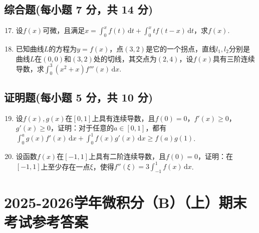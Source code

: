 \documentclass[../Main.tex]{subfiles}
\begin{document}
\section{综合题(每小题 7 分，共 14 分)}
\begin{enumerate}
    \setcounter{enumi}{16}
    \item 设$f(x)$可微，且满足$x=\int_{0}^{x}f(t)\,\mathrm{d}t+\int_{0}^{x}tf(
              t-x)\,\mathrm{d}t$，求$f(x)$.
          \vspace{12em}

    \item 已知曲线$L$的方程为$y=f(x)$，点$(3,2)$是它的一个拐点，直线$l_{1},l
                  _{2}$分别是曲线$L$在$(0,0)$和$(3,2)$处的切线，其交点为$(2,4)$，设$f(x)$具有三阶连续导数，求$\int
              _{0}^{3}(x^{2}+x)f'''(x)\,\mathrm{d}x$.
          \vspace{13em}
\end{enumerate}

\section{证明题(每小题 5 分，共 10 分)}
\begin{enumerate}
    \setcounter{enumi}{18}
    \item 设$f(x),g(x)$在$[0,1]$上具有连续导数，且$f(0)=0$，$f'(x)\geq 0$，$g
              '(x)\geq 0$，证明：对于任意的$a\in[0,1]$，都有$\int_{0}^{a}g(x)f'(x)\,\mathrm{d}
              x+\int_{0}^{1}f(x)g'(x)\,\mathrm{d}x\geq f(a)g(1)$.
          \vspace{15em}

    \item 设函数$f(x)$在$[-1,1]$上具有二阶连续导数，且$f(0)=0$，证明：在$[-1
                  ,1]$上至少存在一点$\xi$，使得$f''(\xi)=3\int_{-1}^{1}f(x)\,\mathrm{d}x$.
          \vspace{15em}
\end{enumerate}

\chapter{2025-2026学年微积分（B）（上）期末考试参考答案}
\end{document}

